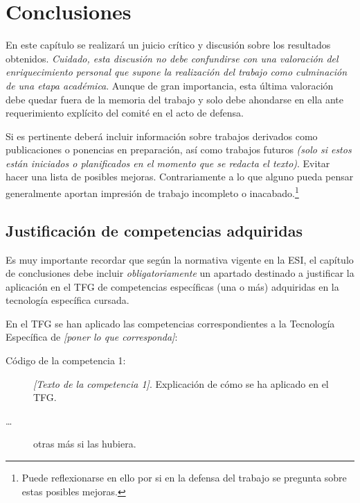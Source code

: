 \chapter{Conclusiones}
\label{cap:Conclusiones}

En este capítulo se realizará un juicio crítico y discusión sobre los resultados obtenidos. \emph{Cuidado, esta discusión no debe confundirse con una valoración del enriquecimiento personal que supone la realización del trabajo como culminación de una etapa académica}. Aunque de gran importancia, esta última valoración debe quedar fuera de la memoria del trabajo y solo debe ahondarse en ella ante requerimiento explícito del comité en el acto de defensa.

Si es pertinente deberá incluir información sobre trabajos derivados como publicaciones o ponencias en preparación, así como trabajos futuros \emph{(solo si estos están iniciados o planificados en el momento que se redacta el texto)}. Evitar hacer una lista de posibles mejoras. Contrariamente a lo que alguno pueda pensar generalmente aportan impresión de trabajo incompleto o inacabado.\footnote{Puede reflexionarse en ello por si en la defensa del trabajo se pregunta sobre estas posibles mejoras.}


\section{Justificación de competencias adquiridas}
Es muy importante recordar que según la normativa vigente en la ESI, el capítulo de conclusiones debe incluir \emph{obligatoriamente} un apartado destinado a justificar la aplicación en el TFG de competencias específicas (una o más) adquiridas en la tecnología específica cursada.

En el TFG se han aplicado las competencias correspondientes a la Tecnología Específica de \emph{[poner lo que corresponda]}:

\begin{description}
\item[Código de la competencia 1:] \emph{[Texto de la competencia 1]}. Explicación de cómo se ha aplicado en el TFG.
\item[\dots] otras más si las hubiera.
\end{description}






